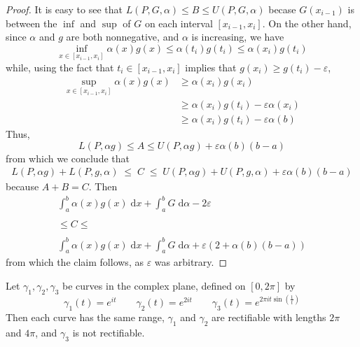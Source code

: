 \documentclass{homework}
\begin{document}
\begin{proof}
		It is easy to see that $L(P, G, \alpha) \le B \le U(P, G, \alpha)$ becase $G(x_{i-1})$ is between the $\inf$ and $\sup$ of $G$ on each interval $[x_{i-1},x_i]$. On the other hand, since $\alpha$ and $g$ are both nonnegative, and $\alpha$ is increasing, we have
		$$
		\inf_{x\in[x_{i-1},x_i]}\alpha(x)g(x) \le \alpha(t_i)g(t_i) \le \alpha(x_i)g(t_i)
		$$
		while, using the fact that $t_i\in[x_{i-1},x_i]$ implies that $g(x_i) \ge g(t_i) - \varepsilon$,
		$$
		\begin{aligned}
			\sup_{x\in[x_{i-1},x_i]}\alpha(x)g(x) &\ge \alpha(x_i)g(x_i) \\
			&\ge\alpha(x_i)g(t_i) - \varepsilon \alpha(x_i) 
			\\&\ge\alpha(x_i)g(t_i) - \varepsilon\alpha(b)
		\end{aligned}
		$$
		Thus,
		$$
		L(P, \alpha g) \le A \le U(P, \alpha g) + \varepsilon\alpha(b)(b-a)
		$$
		from which we conclude that
		$$
		\begin{aligned}
			L(P, \alpha g) + L(P, g, \alpha) \;\le\; C \;\le\; U(P, \alpha g) + U(P, g, \alpha) + \varepsilon\alpha(b)(b-a)
		\end{aligned}
		$$
		because $A + B = C$. Then
		$$
		\begin{gathered}
			\int_a^b \alpha(x)g(x)\;\text{d}x + \int_a^b G\;\text{d}\alpha - 2\varepsilon \\\\\le C \le\\\\ \int_a^b\alpha(x)g(x)\;\text{d}x + \int_a^b G\;\text{d}\alpha + \varepsilon(2 + \alpha(b)(b-a))
		\end{gathered}
		$$
		from which the claim follows, as $\varepsilon$ was arbitrary.
	\end{proof}
	
	
	Let $\gamma_1, \gamma_2, \gamma_3$ be curves in the complex plane, defined on $[0,2\pi]$ by
	$$
	\gamma_1(t) = e^{it}\qquad \gamma_2(t) = e^{2it}\qquad \gamma_3(t) = e^{2\pi it\sin\left(\frac{1}{t}\right)}
	$$
	Then each curve has the same range, $\gamma_1$ and $\gamma_2$ are rectifiable with lengths $2\pi$ and $4\pi$, and $\gamma_3$ is not rectifiable.
	
\end{document}
